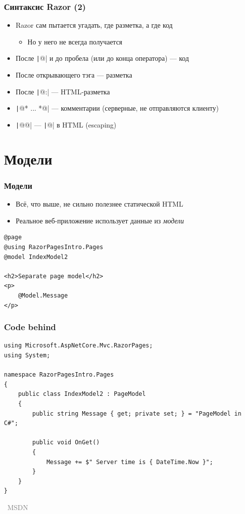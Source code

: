 \documentclass[xetex,mathserif,serif]{beamer}
\newcommand{\attribution}[1] {
\vspace{-5mm}\begin{flushright}\begin{scriptsize}\textcolor{gray}{\textcopyright\, #1}\end{scriptsize}\end{flushright}
}
\begin{document}
    \begin{frame}
        \frametitle{Синтаксис Razor (2)}
        \begin{itemize}
            \item Razor сам пытается угадать, где разметка, а где код
            \begin{itemize}
                \item Но у него не всегда получается
            \end{itemize}
            \item После \texttt|@| и до пробела (или до конца оператора) --- код
            \item После открывающего тэга --- разметка
            \item После \texttt|@:| --- HTML-разметка
            \item \texttt|@* ... *@| --- комментарии (серверные, не отправляются клиенту)
            \item \texttt|@@| --- \texttt|@| в HTML (escaping)
        \end{itemize}
    \end{frame}

    \section{Модели}

    \begin{frame}[fragile]
        \frametitle{Модели}
        \begin{itemize}
            \item Всё, что выше, не сильно полезнее статической HTML
            \item Реальное веб-приложение использует данные из \emph{модели}
        \end{itemize}
        \begin{verbatim}
@page
@using RazorPagesIntro.Pages
@model IndexModel2

<h2>Separate page model</h2>
<p>
    @Model.Message
</p>
        \end{verbatim}
    \end{frame}

    \begin{frame}[fragile]
        \frametitle{Code behind}
        \begin{small}
            \begin{verbatim}
using Microsoft.AspNetCore.Mvc.RazorPages;
using System;

namespace RazorPagesIntro.Pages
{
    public class IndexModel2 : PageModel
    {
        public string Message { get; private set; } = "PageModel in C#";

        public void OnGet()
        {
            Message += $" Server time is { DateTime.Now }";
        }
    }
}
            \end{verbatim}
        \end{small}
        \attribution{MSDN}
    \end{frame}
\end{document}
